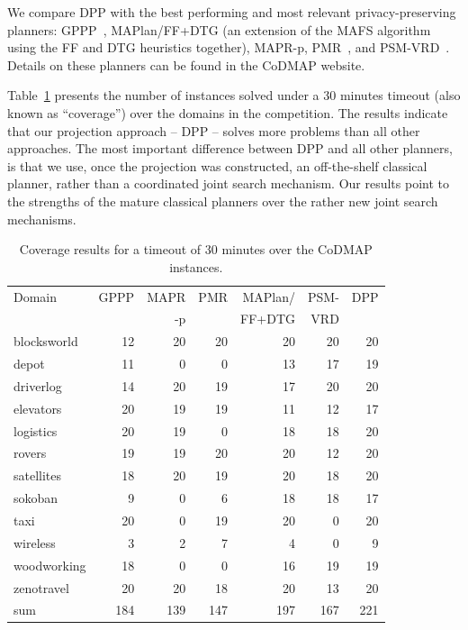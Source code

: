 \documentclass[letterpaper]{article}
\theoremstyle{definition}
\begin{document}
We compare DPP with the best performing and most relevant privacy-preserving planners: GPPP~\cite{maliah2015privacy}, MAPlan/FF+DTG (an extension of the MAFS algorithm~\cite{nissim2014distributed} using the FF and DTG heuristics together), MAPR-p, PMR~\cite{luis2014planMerging}, and PSM-VRD~\cite{tovzivcka2014generating,jakubuv2015multiagent}. Details on these planners can be found in the CoDMAP website.

Table~\ref{tbl:codmap} presents the number of instances solved under a 30 minutes timeout (also known as ``coverage'') over the domains in the competition. The results indicate that our projection approach -- DPP -- solves more problems than all other approaches. The most important difference between DPP and all other planners, is that we use, once the projection was constructed, an off-the-shelf classical planner, rather than a coordinated joint search mechanism. Our results point to the strengths of the mature classical planners over the rather new joint search mechanisms.

\begin{table}
\centering
\scriptsize
\begin{tabular}{l|rrrrrr}

Domain			&GPPP	&MAPR	&PMR	&MAPlan/ &PSM-	&DPP\\
	    		&		&-p	    &	    &FF+DTG	 &VRD	&\\\hline
blocksworld		&12		&20		&20		&20		&20		&20\\
depot			&11		&0		&0		&13		&17		&19\\
driverlog		&14		&20		&19		&17		&20		&20\\
elevators		&20		&19		&19		&11		&12		&17\\
logistics		&20		&19		&0		&18		&18		&20\\
rovers			&19		&19		&20		&20		&12		&20\\
satellites		&18		&20		&19		&20		&18		&20\\
sokoban			&9		&0		&6		&18		&18		&17\\
taxi			&20		&0		&19		&20		&0		&20\\
wireless		&3		&2		&7		&4		&0		&9\\
woodworking		&18		&0		&0		&16		&19		&19\\
zenotravel		&20		&20		&18		&20		&13		&20\\	\hline
sum				&184	&139	&147	&197	&167	&221\\

\end{tabular}
\caption{Coverage results for a timeout of 30 minutes over the CoDMAP instances.}
\label{tbl:codmap}
\vspace{-0.5cm}
\end{table}
\end{document}
